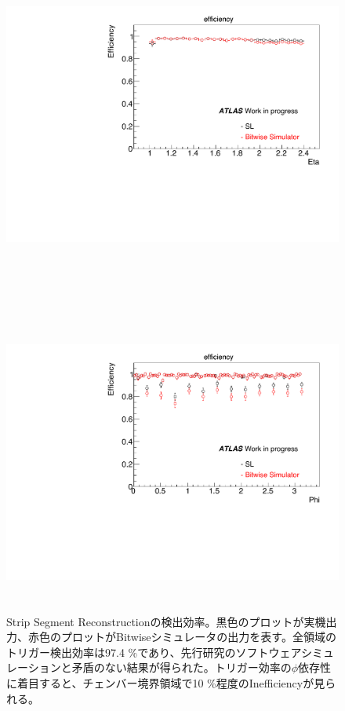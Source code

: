 \begin{figure}
\begin{minipage}[b]{\linewidth}
\centering
\includegraphics[height=10cm]{fig/Test/A_SM_strip_eta.pdf}
\end{minipage}\\
\begin{minipage}[b]{\linewidth}
\centering
\includegraphics[height=10cm]{fig/Test/A_SM_strip_phi.pdf}
\end{minipage}%
\caption[Strip Segment Reconstructionの検出効率]{Strip Segment Reconstructionの検出効率。黒色のプロットが実機出力、赤色のプロットがBitwiseシミュレータの出力を表す。全領域のトリガー検出効率は97.4 \%であり、先行研究のソフトウェアシミュレーションと矛盾のない結果が得られた。トリガー効率の$\phi$依存性に着目すると、チェンバー境界領域で10 \%程度のInefficiencyが見られる。}
\label{SM_A_strip}
\end{figure}



